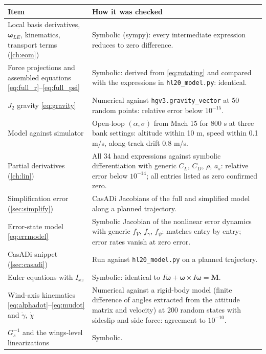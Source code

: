 \documentclass[11pt]{report}
\numberwithin{equation}{chapter}
\newcommand{\vb}[1]{\bm{#1}}
\newcommand{\code}[1]{\texttt{#1}}
\begin{document}
\begin{center}
\renewcommand{\arraystretch}{1.25}
\begin{tabular}{@{}>{\raggedright\arraybackslash}p{}>{\raggedright\arraybackslash}p{}@{}}
\toprule
Item & How it was checked \\
\midrule
Local basis derivatives, $\vb\omega_{LE}$, kinematics, transport terms (\cref{ch:eom}) &
  Symbolic (sympy): every intermediate expression reduces to zero difference. \\
Force projections and assembled equations \cref{eq:full_r}--\cref{eq:full_psi} &
  Symbolic: derived from \cref{eq:rotating} and compared with the expressions in
  \code{hl20\_model.py}: identical. \\
$J_2$ gravity \cref{eq:gravity} & Numerical against \code{hgv3.gravity\_vector} at 50 random
  points: relative error below $10^{-15}$. \\
Model against simulator & Open-loop $(\alpha,\sigma)$ from Mach 15 for 800 s at three bank
  settings: altitude within 10 m, speed within 0.1 m/s, along-track drift 0.8 m/s. \\
Partial derivatives (\cref{ch:lin}) & All 34 hand expressions against symbolic
  differentiation with generic $C_L$, $C_D$, $\rho$, $a_s$: relative error below
  $10^{-14}$; all entries listed as zero confirmed zero. \\
Simplification error (\cref{sec:simplify}) & CasADi Jacobians of the full and simplified
  model along a planned trajectory. \\
Error-state model \cref{eq:errmodel} & Symbolic Jacobian of the nonlinear error dynamics with
  generic $f_V$, $f_\gamma$, $f_\psi$: matches entry by entry; error rates vanish at zero
  error. \\
CasADi snippet (\cref{sec:casadi}) & Run against \code{hl20\_model.py} on a planned
  trajectory. \\
Euler equations with $I_{xz}$ & Symbolic: identical to $I\dot{\vb\omega}+\vb\omega\times I\vb\omega=\vb M$. \\
Wind-axis kinematics \cref{eq:alphadot}--\cref{eq:mudot} and $\dot\gamma$, $\dot\chi$ &
  Numerical against a rigid-body model (finite difference of angles extracted from the
  attitude matrix and velocity) at 200 random states with sideslip and side force: agreement
  to $10^{-10}$. \\
$G_s^{-1}$ and the wings-level linearizations & Symbolic. \\
\bottomrule
\end{tabular}
\end{center}
\end{document}
